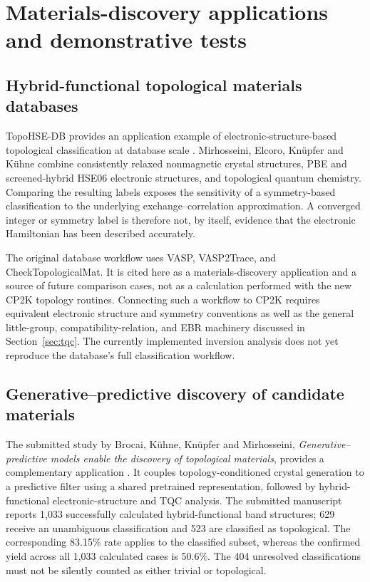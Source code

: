 \section{Materials-discovery applications and demonstrative tests}
\label{sec:applications}
\subsection{Hybrid-functional topological materials databases}
TopoHSE-DB provides an application example of electronic-structure-based
topological classification at database scale
\cite{Mirhosseini2026TopoHSE}. Mirhosseini, Elcoro, Kn\"upfer and
K\"uhne combine consistently relaxed nonmagnetic crystal structures,
PBE and screened-hybrid HSE06 electronic structures, and topological
quantum chemistry. Comparing the resulting labels exposes the
sensitivity of a symmetry-based classification to the underlying
exchange--correlation approximation. A converged integer or symmetry
label is therefore not, by itself, evidence that the electronic
Hamiltonian has been described accurately.

The original database workflow uses VASP, VASP2Trace, and
CheckTopologicalMat. It is cited here as a materials-discovery
application and a source of future comparison cases, not as a
calculation performed with the new CP2K topology routines.
Connecting such a workflow to CP2K requires equivalent electronic
structure and symmetry conventions as well as the general little-group,
compatibility-relation, and EBR machinery discussed in
Section~\ref{sec:tqc}. The currently implemented inversion analysis
does not yet reproduce the database's full classification workflow.

\subsection{Generative--predictive discovery of candidate materials}
The submitted study by Brocai, K\"uhne, Kn\"upfer and Mirhosseini,
\emph{Generative--predictive models enable the discovery of topological
materials}, provides a complementary application
\cite{Brocai2026Discovery}. It couples topology-conditioned crystal
generation to a predictive filter using a shared pretrained
representation, followed by hybrid-functional electronic-structure
and TQC analysis. The submitted manuscript reports 1,033 successfully
calculated hybrid-functional band structures; 629 receive an unambiguous
classification and 523 are classified as topological. The corresponding
83.15\% rate applies to the classified subset, whereas the confirmed
yield across all 1,033 calculated cases is 50.6\%. The 404 unresolved
classifications must not be silently counted as either trivial or
topological.

